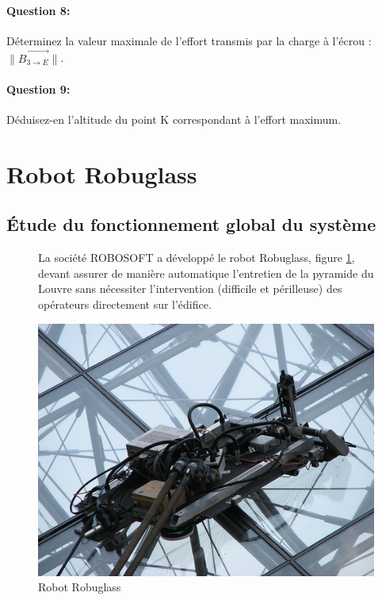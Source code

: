 \paragraph{Question 8:} Déterminez la valeur maximale de l'effort transmis par la charge à l'écrou : $\|\overrightarrow{B_{3\rightarrow E}}\|$.

\paragraph{Question 9:} Déduisez-en l'altitude du point K correspondant à l'effort maximum.

\newpage

\section{Robot Robuglass}

\subsection{Étude du fonctionnement global du système}

\begin{figure}[!h]
 \begin{minipage}{0.45\linewidth}
La société ROBOSOFT a développé le robot Robuglass, figure \ref{robuglass}, devant assurer de manière automatique l'entretien de la pyramide du Louvre sans nécessiter l'intervention (difficile et périlleuse) des opérateurs directement sur l'édifice.
 \end{minipage}
 \hfill
 \begin{minipage}{0.45\linewidth}
 \centering\includegraphics[width=0.9\linewidth]{img/robuglass.jpg}
 \end{minipage}
 \caption{Robot Robuglass}
 \label{robuglass}
\end{figure}


